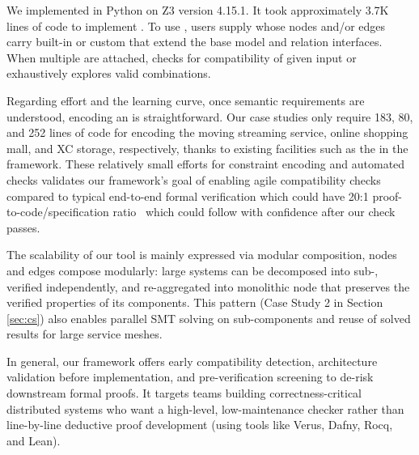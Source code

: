 We implemented \sysname{} in Python on Z3 version 4.15.1. It took
approximately 3.7K lines of code to implement \sysname{}. 
%
To use \sysname{}, users supply \sysgraph whose nodes and/or edges carry
built-in or custom \sysmods that extend the base model and relation interfaces.
When multiple \sysmods are attached, \sysname checks for compatibility of given
input or exhaustively explores valid combinations.


Regarding effort and the learning curve, once semantic requirements are understood, encoding an \sysgraph is straightforward.
Our case studies only require 183, 80, and 252 lines of code for encoding the moving streaming service, online shopping mall, and XC storage, respectively, thanks to existing facilities such as the \sysmods{} in the \sysname{} framework. 
These relatively small efforts for constraint encoding and automated checks validates our framework's goal of enabling agile compatibility checks compared to typical end-to-end formal verification which could have 20:1 proof-to-code/specification ratio~\cite{certikos-osdi16, klein2009sel4, wormspace, ironfleet} which could follow with confidence after our check passes. 

The scalability of our tool is mainly expressed via modular composition,
\sysgraph nodes and edges compose modularly: large systems can be decomposed into sub-\sysgraphs,
verified independently, and re-aggregated into monolithic node that preserves the verified properties of its components.
This pattern (\eg Case Study 2 in Section \ref{sec:cs}) also enables parallel SMT solving on sub-components and 
reuse of solved results for large service meshes.

In general, our framework offers early compatibility detection,
architecture validation before implementation, and pre-verification screening to de-risk downstream formal proofs.
It targets teams building correctness-critical distributed systems who want a high-level, low-maintenance checker rather than line-by-line deductive proof development (\eg using tools like Verus\cite{verus}, Dafny\cite{dafny}, Rocq\cite{coq}, and Lean\cite{lean}).


